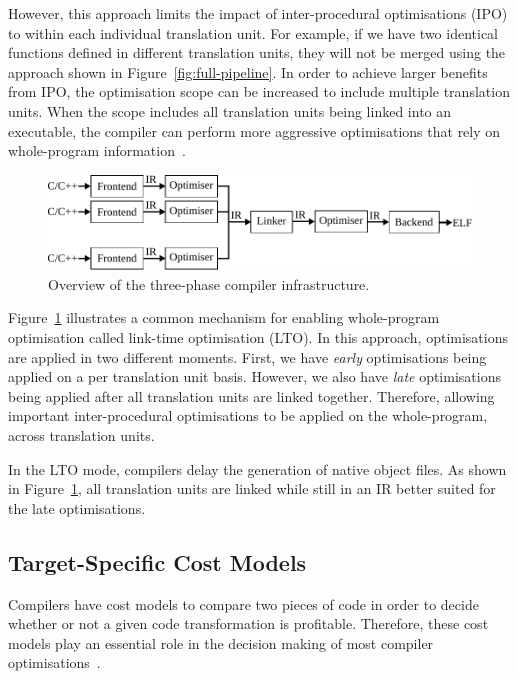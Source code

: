 However, this approach limits the impact of inter-procedural optimisations (IPO) to within each individual translation unit.
For example, if we have two identical functions defined in different translation units, they will not be merged using the approach shown in Figure~\ref{fig:full-pipeline}.
In order to achieve larger benefits from IPO, the optimisation scope can be increased to include multiple translation units.
When the scope includes all translation units being linked into an executable, the compiler can perform  more aggressive optimisations that rely on whole-program information~\cite{johnson17}.

\begin{figure}[h]
  \centering
  \includegraphics[scale=0.85]{src/background/figs/full-pipeline-LTO.pdf}
  \caption{Overview of the three-phase compiler infrastructure.}
  \label{fig:full-LTO-pipeline}
\end{figure}

Figure~\ref{fig:full-LTO-pipeline} illustrates a common mechanism for enabling whole-program optimisation called link-time optimisation (LTO).
In this approach, optimisations are applied in two different moments.
First, we have \textit{early} optimisations being applied on a per translation unit basis.
However, we also have \textit{late} optimisations being applied after all translation units are linked together.
Therefore, allowing important inter-procedural optimisations to be applied on the whole-program, across translation units.

In the LTO mode, compilers delay the generation of native object files.
As shown in Figure~\ref{fig:full-LTO-pipeline}, all translation units are linked while still in an IR better suited for the late optimisations.


\subsection{Target-Specific Cost Models} \label{sec:background:costmodel}

Compilers have cost models to compare two pieces of code in order to decide whether or not a given code transformation is profitable.
Therefore, these cost models play an essential role in the decision making of most compiler optimisations~\cite{porpodas18b,pohl18}.

